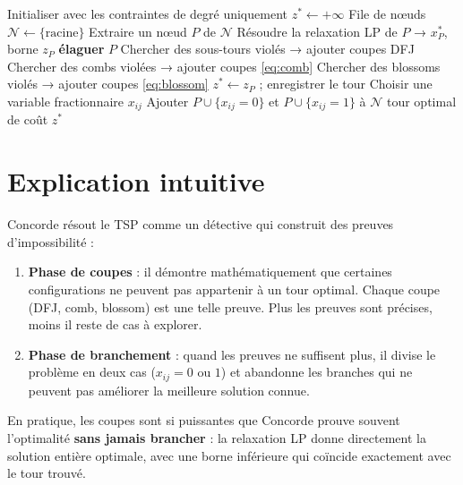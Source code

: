 \documentclass[12pt, a4paper]{article}
\begin{document}
\begin{algorithm}[H]
\caption{Pipeline Concorde (branch-and-cut TSP)}
\begin{algorithmic}[1]
\State Initialiser avec les contraintes de degré uniquement
\State $z^* \leftarrow +\infty$ 
\State File de nœuds $\mathcal{N} \leftarrow \{\text{racine}\}$
  \State Extraire un nœud $P$ de $\mathcal{N}$
  \Repeat {}
    \State Résoudre la relaxation LP de $P$ → $x^*_P$, borne $z_P$
     \textbf{élaguer} $P$ \EndIf
    \State Chercher des sous-tours violés → ajouter coupes DFJ
    \State Chercher des combs violées → ajouter coupes \eqref{eq:comb}
    \State Chercher des blossoms violés → ajouter coupes \eqref{eq:blossom}
     $z^* \leftarrow z_P$ ; enregistrer le tour \EndIf
  \Else {}
    \State Choisir une variable fractionnaire $x_{ij}$
    \State Ajouter $P \cup \{x_{ij}=0\}$ et $P \cup \{x_{ij}=1\}$ à $\mathcal{N}$
  \EndIf
\EndWhile
\State \Return tour optimal de coût $z^*$
\end{algorithmic}
\end{algorithm}

\section{Explication intuitive}

Concorde résout le TSP comme un détective qui construit des preuves
d'impossibilité :

\begin{enumerate}
  \item \textbf{Phase de coupes} : il démontre mathématiquement que certaines
    configurations ne peuvent pas appartenir à un tour optimal. Chaque coupe
    (DFJ, comb, blossom) est une telle preuve. Plus les preuves sont précises,
    moins il reste de cas à explorer.

  \item \textbf{Phase de branchement} : quand les preuves ne suffisent plus,
    il divise le problème en deux cas ($x_{ij}=0$ ou $1$) et abandonne les
    branches qui ne peuvent pas améliorer la meilleure solution connue.
\end{enumerate}

En pratique, les coupes sont si puissantes que Concorde prouve souvent
l'optimalité \textbf{sans jamais brancher} : la relaxation LP donne
directement la solution entière optimale, avec une borne inférieure qui
coïncide exactement avec le tour trouvé.
\end{document}
